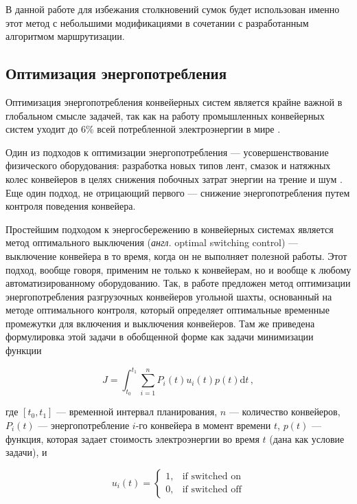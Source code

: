 \documentclass[specification,annotation,times]{itmo-student-thesis}
\theoremstyle{definition}
\begin{document}
В данной работе для избежания столкновений сумок будет использован именно этот
метод с небольшими модификациями в сочетании с разработанным алгоритмом маршрутизации.

\subsection{Оптимизация энергопотребления}\label{overview:energy}

Оптимизация энергопотребления конвейерных систем является крайне важной в
глобальном смысле задачей, так как на работу промышленных конвейерных систем
уходит до 6\% всей потребленной электроэнергии в мире \cite{halepoto2016design}.

Один из подходов к оптимизации энергопотребления --- усовершенствование
физического оборудования: разработка новых типов лент, смазок и натяжных колес
конвейеров в целях снижения побочных затрат энергии на трение и шум
\cite{staniak1996energy}. Еще один подход, не отрицающий первого --- снижение
энергопотребления путем контроля поведения конвейера.

Простейшим подходом к энергосбережению в конвейерных системах является
метод оптимального выключения (\textit{англ.} optimal switching control) ---
выключение конвейера в то время, когда он не выполняет полезной работы. Этот
подход, вообще говоря, применим не только к конвейерам, но и вообще к любому
автоматизированному оборудованию. Так, в работе
\cite{middelberg2009optimal} предложен метод оптимизации энергопотребления
разгрузочных конвейеров угольной шахты, основанный на методе оптимального
контроля, который определяет оптимальные временные промежутки для включения и
выключения конвейеров. Там же приведена формулировка этой задачи в обобщенной
форме как задачи минимизации функции

\begin{equation}\label{energy:opt-switching-J}
  J = \int_{t_0}^{t_1} \! \sum\limits_{i=1}^n P_i(t) u_i(t) p(t) \mathrm{d}t \,,
\end{equation}

где $[t_0, t_1]$ --- временной интервал планирования, $n$ --- количество
конвейеров, $P_i(t)$ --- энергопотребление $i$-го конвейера в момент времени
$t$, $p(t)$ --- функция, которая задает стоимость электроэнергии во время $t$
(дана как условие задачи), и

\begin{equation}\label{energy:opt-switching-u}
  u_i(t) = \begin{cases}
    1, & \text{if switched on}\\
    0, & \text{if switched off}
  \end{cases}
\end{equation}
\end{document}
